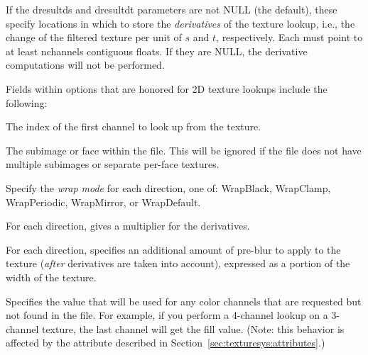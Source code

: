 If the {\cf dresultds} and {\cf dresultdt} parameters are not {\cf NULL}
(the default), these specify locations in which to store the
\emph{derivatives} of the texture lookup, i.e., the change of the filtered
texture per unit of $s$ and $t$, respectively.  Each must point to at least
{\cf nchannels} contiguous floats.  If they are {\cf NULL}, the derivative
computations will not be performed.

Fields within {\cf options} that are honored for 2D texture lookups
include the following:

\vspace{-12pt}
\vspace{10pt}
The index of the first channel to look up from the texture.
\apiend

\vspace{-24pt}
\vspace{10pt}
The subimage or face within the file.
This will be ignored if the file does not have multiple subimages or
separate per-face textures.
\apiend

\vspace{-24pt}
\vspace{10pt}
Specify the \emph{wrap mode} for each direction, one of: 
{\cf WrapBlack}, {\cf WrapClamp}, {\cf WrapPeriodic}, {\cf WrapMirror},
or {\cf WrapDefault}.
\apiend

\vspace{-24pt}
\vspace{10pt}
For each direction, gives a multiplier for the derivatives.
\apiend

\vspace{-24pt}
\vspace{10pt}
For each direction, specifies an additional amount of pre-blur to apply
to the texture (\emph{after} derivatives are taken into account),
expressed as a portion of the width of the texture.
\apiend

\vspace{-24pt}
\vspace{10pt}
Specifies the value that will be used for any color channels that are
requested but not found in the file.  For example, if you perform a
4-channel lookup on a 3-channel texture, the last channel will
get the fill value.  (Note: this behavior is affected by the
 attribute described in 
Section~\ref{sec:texturesys:attributes}.)
\apiend

